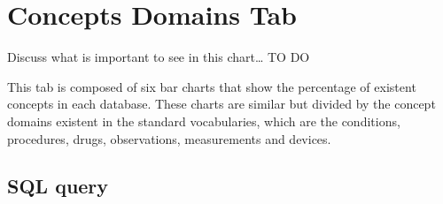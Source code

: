\documentclass[]{book}
\begin{document}
\section{Concepts Domains Tab}\label{concepts-domains-tab}

Discuss what is important to see in this chart\ldots{} TO DO

This tab is composed of six bar charts that show the percentage of
existent concepts in each database. These charts are similar but divided
by the concept domains existent in the standard vocabularies, which are
the conditions, procedures, drugs, observations, measurements and
devices.

\subsection{SQL query}\label{sql-query-17}
\end{document}
